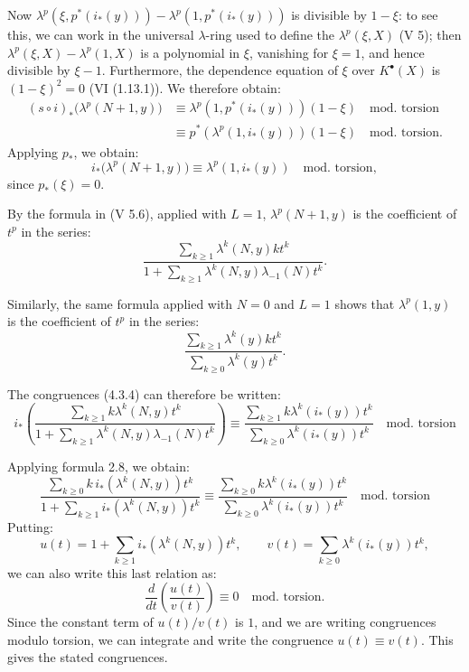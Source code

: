 %
Now \(\lambda^p(\xi,p^*(i_*(y)))-\lambda^p(1,p^*(i_*(y)))\) is divisible by \(1-\xi\): to see this, we can work in the universal \(\lambda\)-ring used to define the \(\lambda^p(\xi,X)\) (V 5); then \(\lambda^p(\xi,X)-\lambda^p(1,X)\) is a polynomial in \(\xi\), vanishing for \(\xi=1\), and hence divisible by \(\xi-1\). Furthermore, the dependence equation of \(\xi\) over \(K^{\bullet}(X)\) is \((1-\xi)^2=0\) (VI (1.13.1)). We therefore obtain:
\[
\begin{aligned}
(s\circ i)_*\bigl(\lambda^p(N+1,y)\bigr)
&\equiv \lambda^p(1,p^*(i_*(y)))(1-\xi) \quad\text{mod.\ torsion}\\
&\equiv p^*(\lambda^p(1,i_*(y)))(1-\xi) \quad\text{mod.\ torsion}.
\end{aligned}
\]
Applying \(p_*\), we obtain:
\begin{equation}\tag{4.3.4}
  i_*\bigl(\lambda^p(N+1,y)\bigr)
  \equiv \lambda^p(1,i_*(y)) \quad\text{mod.\ torsion},
\end{equation}
since \(p_*(\xi)=0\).

By the formula in (V 5.6), applied with \(L=1\), \(\lambda^p(N+1,y)\) is the coefficient of \(t^p\) in the series:
\[
  \frac{\sum_{k\ge1}\lambda^k(N,y)kt^k}
       {1+\sum_{k\ge1}\lambda^k(N,y)\lambda_{-1}(N)t^k}.
\]

Similarly, the same formula applied with \(N=0\) and \(L=1\) shows that \(\lambda^p(1,y)\) is the coefficient of \(t^p\) in the series:
\[
  \frac{\sum_{k\ge1}\lambda^k(y)kt^k}
       {\sum_{k\ge0}\lambda^k(y)t^k}.
\]

The congruences (4.3.4) can therefore be written:
\[
i_*\left(
  \frac{\sum_{k\ge1}k\lambda^k(N,y)t^k}
       {1+\sum_{k\ge1}\lambda^k(N,y)\lambda_{-1}(N)t^k}
\right)
\equiv
  \frac{\sum_{k\ge1}k\lambda^k(i_*(y))t^k}
       {\sum_{k\ge0}\lambda^k(i_*(y))t^k}
       \quad\text{mod.\ torsion}
\]

%
Applying formula 2.8, we obtain:
\[
  \frac{\sum_{k\ge0}k\,i_*(\lambda^k(N,y))t^k}
       {1+\sum_{k\ge1} i_*(\lambda^k(N,y))t^k}
  \equiv
  \frac{\sum_{k\ge0}k\lambda^k(i_*(y))t^k}
       {\sum_{k\ge0}\lambda^k(i_*(y))t^k}
       \quad\text{mod.\ torsion}
\]
Putting:
\[
  u(t)=1+\sum_{k\ge1}i_*(\lambda^k(N,y))t^k,\qquad
  v(t)=\sum_{k\ge0}\lambda^k(i_*(y))t^k,
\]
we can also write this last relation as:
\[
  \frac{d}{dt}\!\left(\frac{u(t)}{v(t)}\right)\equiv0
  \quad\text{mod.\ torsion}.
\]
Since the constant term of \(u(t)/v(t)\) is \(1\), and we are writing congruences modulo torsion, we can integrate and write the congruence \(u(t)\equiv v(t)\). This gives the stated congruences.

